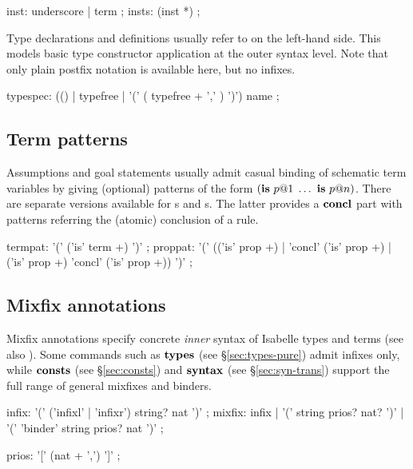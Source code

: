 \begin{rail}
  inst: underscore | term
  ;
  insts: (inst *)
  ;
\end{rail}

Type declarations and definitions usually refer to  on
the left-hand side.  This models basic type constructor application at the
outer syntax level.  Note that only plain postfix notation is available here,
but no infixes.

\begin{rail}
  typespec: (() | typefree | '(' ( typefree + ',' ) ')') name
  ;
\end{rail}


\subsection{Term patterns}\label{sec:term-pats}

Assumptions and goal statements usually admit casual binding of schematic term
variables by giving (optional) patterns of the form $({\mathord{\mathbf{is}}}~p@1\;\dots~{\mathord{\mathbf{is}}}~p@n)$.
There are separate versions available for s and
s.  The latter provides a ${\mathord{\mathbf{concl}}}$ part with patterns
referring the (atomic) conclusion of a rule.

\begin{rail}
  termpat: '(' ('is' term +) ')'
  ;
  proppat: '(' (('is' prop +) | 'concl' ('is' prop +) | ('is' prop +) 'concl' ('is' prop +)) ')'
  ;
\end{rail}


\subsection{Mixfix annotations}

Mixfix annotations specify concrete \emph{inner} syntax of Isabelle types and
terms (see also \cite{isabelle-ref}).  Some commands such as ${\mathord{\mathbf{types}}}$ (see
\S\ref{sec:types-pure}) admit infixes only, while ${\mathord{\mathbf{consts}}}$ (see
\S\ref{sec:consts}) and ${\mathord{\mathbf{syntax}}}$ (see \S\ref{sec:syn-trans})
support the full range of general mixfixes and binders.

\begin{rail}
  infix: '(' ('infixl' | 'infixr') string? nat ')'
  ;
  mixfix: infix | '(' string prios? nat? ')' | '(' 'binder' string prios? nat ')'
  ;

  prios: '[' (nat + ',') ']'
  ;
\end{rail}


